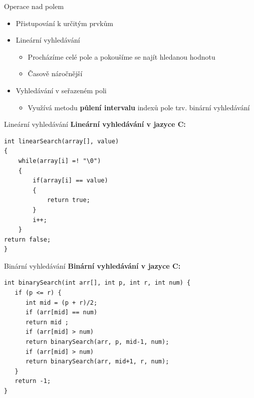 \documentclass[10pt, hyperref={unicode}]{beamer}
\begin{document}
\begin{frame}{Operace nad polem}
\begin{itemize}
    \item Přistupování k určitým prvkům
    \item Lineární vyhledávání
        \begin{itemize}
            \item Procházíme celé pole a pokoušíme se najít hledanou hodnotu
            \item Časově náročnější
        \end{itemize}
    \item Vyhledávání v seřazeném poli
        \begin{itemize}
            \item Využívá metodu \textbf{půlení intervalu} indexů pole tzv. binární vyhledávání 
        \end{itemize}
\end{itemize}
\end{frame}


\begin{frame}[fragile]{Lineární vyhledávání}
\textbf{Lineární vyhledávání v jazyce C:}
\begin{lstlisting}
int linearSearch(array[], value)
{
    while(array[i] =! "\0")
    {
        if(array[i] == value)
        {
            return true;
        }
        i++;
    }
return false;
}
\end{lstlisting}
\end{frame}

\begin{frame}[fragile]{Binární vyhledávání}
\textbf{Binární vyhledávání v jazyce C:}
\begin{lstlisting}
int binarySearch(int arr[], int p, int r, int num) {
   if (p <= r) {
      int mid = (p + r)/2;
      if (arr[mid] == num)
      return mid ;
      if (arr[mid] > num)
      return binarySearch(arr, p, mid-1, num);
      if (arr[mid] > num)
      return binarySearch(arr, mid+1, r, num);
   }
   return -1;
}
\end{lstlisting}
\end{frame}
\end{document}

